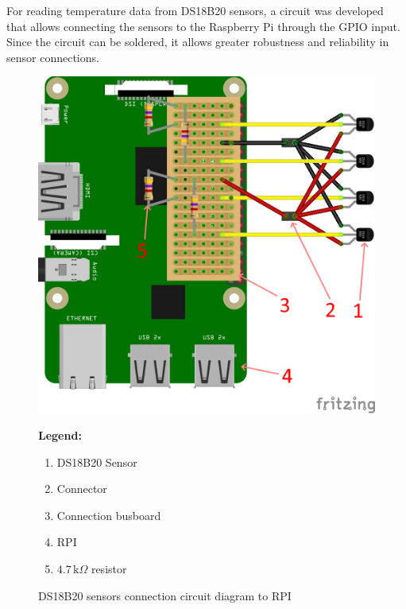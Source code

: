 For reading temperature data from DS18B20 sensors, a circuit was developed that allows connecting the sensors to the Raspberry Pi through the GPIO input. Since the circuit can be soldered, it allows greater robustness and reliability in sensor connections.

\begin{figure}[H]
    \centering
    \begin{minipage}{0.6\textwidth}
        \includegraphics[width=\linewidth]{figures/circuit_dig.png}
    \end{minipage}%
    \hfill
    \begin{minipage}{0.35\textwidth}
        \small
        \textbf{Legend:}
        \begin{enumerate}
            \item DS18B20 Sensor 
            \item Connector
            \item Connection busboard
            \item RPI
            \item $4.7\,\mathrm{k}\Omega$ resistor
        \end{enumerate}
    \end{minipage}
    \caption{DS18B20 sensors connection circuit diagram to RPI}
    \label{fig:circuit_dig}
\end{figure}

